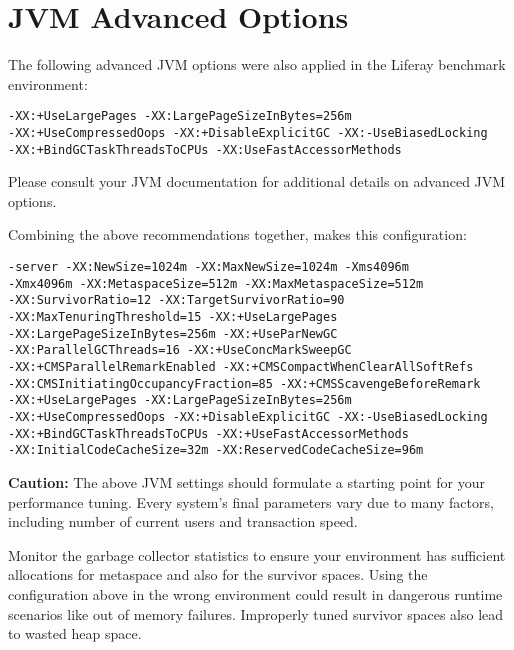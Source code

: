 \noindent\hrulefill

\section{JVM Advanced Options}\label{jvm-advanced-options}

The following advanced JVM options were also applied in the Liferay
benchmark environment:

\begin{verbatim}
-XX:+UseLargePages -XX:LargePageSizeInBytes=256m 
-XX:+UseCompressedOops -XX:+DisableExplicitGC -XX:-UseBiasedLocking 
-XX:+BindGCTaskThreadsToCPUs -XX:UseFastAccessorMethods
\end{verbatim}

Please consult your JVM documentation for additional details on advanced
JVM options.

Combining the above recommendations together, makes this configuration:

\begin{verbatim}
-server -XX:NewSize=1024m -XX:MaxNewSize=1024m -Xms4096m
-Xmx4096m -XX:MetaspaceSize=512m -XX:MaxMetaspaceSize=512m
-XX:SurvivorRatio=12 -XX:TargetSurvivorRatio=90
-XX:MaxTenuringThreshold=15 -XX:+UseLargePages 
-XX:LargePageSizeInBytes=256m -XX:+UseParNewGC 
-XX:ParallelGCThreads=16 -XX:+UseConcMarkSweepGC 
-XX:+CMSParallelRemarkEnabled -XX:+CMSCompactWhenClearAllSoftRefs
-XX:CMSInitiatingOccupancyFraction=85 -XX:+CMSScavengeBeforeRemark 
-XX:+UseLargePages -XX:LargePageSizeInBytes=256m
-XX:+UseCompressedOops -XX:+DisableExplicitGC -XX:-UseBiasedLocking
-XX:+BindGCTaskThreadsToCPUs -XX:+UseFastAccessorMethods
-XX:InitialCodeCacheSize=32m -XX:ReservedCodeCacheSize=96m
\end{verbatim}

\noindent\hrulefill

\textbf{Caution:} The above JVM settings should formulate a starting
point for your performance tuning. Every system's final parameters vary
due to many factors, including number of current users and transaction
speed.

\noindent\hrulefill

Monitor the garbage collector statistics to ensure your environment has
sufficient allocations for metaspace and also for the survivor spaces.
Using the configuration above in the wrong environment could result in
dangerous runtime scenarios like out of memory failures. Improperly
tuned survivor spaces also lead to wasted heap space.

